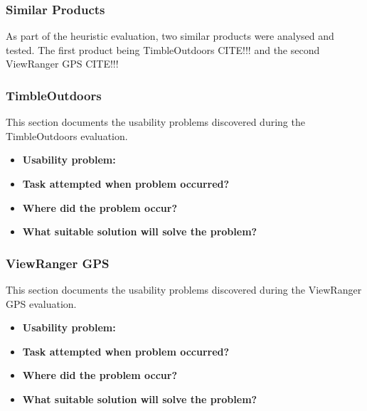 \documentclass[11pt,a4paper]{article}
\begin{document}
\subsubsection{Similar Products}
As part of the heuristic evaluation, two similar products were analysed and tested. The first product being TimbleOutdoors CITE!!! and the second ViewRanger GPS CITE!!!

\subsubsection{TimbleOutdoors}

This section documents the usability problems discovered during the TimbleOutdoors evaluation. 

\begin{itemize}
	\item\textbf{Usability problem:}\\
	
	\item\textbf{Task attempted when problem occurred?}\\
	
	\item\textbf{Where did the problem occur?}\\
	
	\item\textbf{What suitable solution will solve the problem?}\\
\end{itemize}

\subsubsection{ViewRanger GPS}

This section documents the usability problems discovered during the ViewRanger GPS evaluation. 

\begin{itemize}
	\item\textbf{Usability problem:}\\
	
	\item\textbf{Task attempted when problem occurred?}\\
	
	\item\textbf{Where did the problem occur?}\\
	
	\item\textbf{What suitable solution will solve the problem?}\\
\end{itemize}
\end{document}
